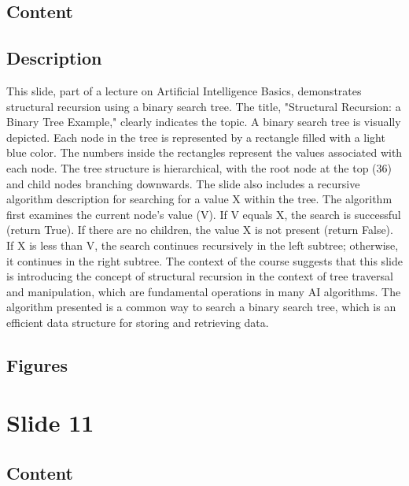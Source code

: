 \documentclass{article}%
\begin{document}
\subsection{Content}%
%
\subsection{Description}%
This slide, part of a lecture on Artificial Intelligence Basics, demonstrates structural recursion using a binary search tree.  The title, "Structural Recursion: a Binary Tree Example," clearly indicates the topic.  A binary search tree is visually depicted.  Each node in the tree is represented by a rectangle filled with a light blue color.  The numbers inside the rectangles represent the values associated with each node.  The tree structure is hierarchical, with the root node at the top (36) and child nodes branching downwards.  The slide also includes a recursive algorithm description for searching for a value X within the tree.  The algorithm first examines the current node's value (V). If V equals X, the search is successful (return True). If there are no children, the value X is not present (return False). If X is less than V, the search continues recursively in the left subtree; otherwise, it continues in the right subtree.  The context of the course suggests that this slide is introducing the concept of structural recursion in the context of tree traversal and manipulation, which are fundamental operations in many AI algorithms.  The algorithm presented is a common way to search a binary search tree, which is an efficient data structure for storing and retrieving data.%
\subsection{Figures}%
\begin{figure}[H]%
\centering%
\end{figure}

%
\newpage%
\section{Slide 11}%
\label{sec:Slide11}%
\subsection{Content}%
%
\end{document}
